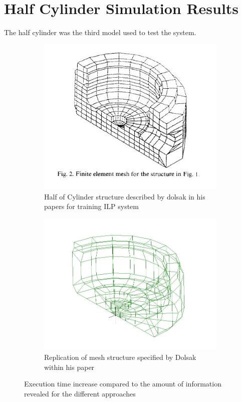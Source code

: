 \newpage
\section{Half Cylinder Simulation Results}
The half cylinder was the third model used to test the system. 
\begin{figure}[H]
\centering
\begin{subfigure}{.5\textwidth}
  \centering
  \includegraphics[width=0.9\linewidth]{../Graphics/HalfCylinder/DolsakCylinderMeshed.jpeg}
  \caption{Half of Cylinder structure described by dolsak in his papers for training ILP system}
  \label{fig:sub1}
\end{subfigure}%
\begin{subfigure}{.5\textwidth}
  \centering
  \includegraphics[width=0.9\linewidth]{../Graphics/HalfCylinder/DolsakCylinderWithinLisa.jpeg}
  \caption{Replication of mesh structure specified by Dolsak within his paper \cite{DolsakPaper91}}
  \label{fig:sub2}
\end{subfigure}
\label{fig:test}
  \caption{Execution time increase compared to the amount of information revealed for the different approaches}
 \end{figure}
 

